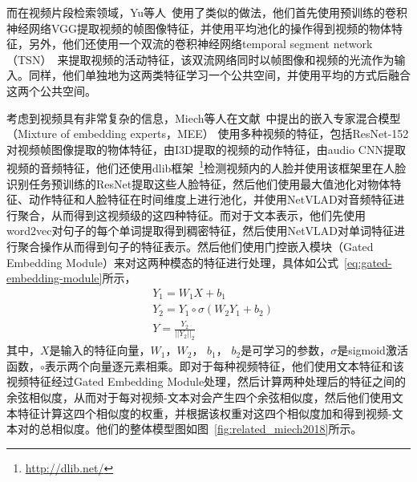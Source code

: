 而在视频片段检索领域，Yu等人~\cite{vsrel2020}使用了类似的做法，他们首先使用预训练的卷积神经网络VGG提取视频的帧图像特征，并使用平均池化的操作得到视频的物体特征，另外，他们还使用一个双流的卷积神经网络temporal segment network（TSN）~\cite{wang2016temporal}来提取视频的活动特征，该双流网络同时以帧图像和视频的光流作为输入。同样，他们单独地为这两类特征学习一个公共空间，并使用平均的方式后融合这两个公共空间。

考虑到视频具有非常复杂的信息，Miech等人在文献~\cite{miech2018learning}中提出的嵌入专家混合模型（Mixture of embedding experts，MEE） 使用多种视频的特征，包括ResNet-152对视频帧图像提取的物体特征，由I3D提取的视频的动作特征，由audio CNN提取视频的音频特征，他们还使用dlib框架~\footnote{\url{http://dlib.net/}}检测视频内的人脸并使用该框架里在人脸识别任务预训练的ResNet提取这些人脸特征，然后他们使用最大值池化对物体特征、动作特征和人脸特征在时间维度上进行池化，并使用NetVLAD对音频特征进行聚合，从而得到这视频级的这四种特征。而对于文本表示，他们先使用word2vec对句子的每个单词提取得到稠密特征，然后使用NetVLAD对单词特征进行聚合操作从而得到句子的特征表示。然后他们使用门控嵌入模块（Gated Embedding Module）来对这两种模态的特征进行处理，具体如公式~\ref{eq:gated-embedding-module}所示，
\begin{equation}
    \label{eq:gated-embedding-module}
    \begin{aligned}
        & Y_1 = W_1 X + b_1 \\
        & Y_2 = Y_1 \circ \sigma(W_2Y_1 + b_2) \\
        & Y = \frac{Y_2}{||Y_2||_2}
    \end{aligned}
\end{equation}
其中，$X$是输入的特征向量，$W_1$，$W_2$， $b_1$， $b_2$是可学习的参数，$\sigma$是sigmoid激活函数，$\circ$表示两个向量逐元素相乘。即对于每种视频特征，他们使用文本特征和该视频特征经过Gated Embedding Module处理，然后计算两种处理后的特征之间的余弦相似度，从而对于每对视频-文本对会产生四个余弦相似度，然后他们使用文本特征计算这四个相似度的权重，并根据该权重对这四个相似度加和得到视频-文本对的总相似度。他们的整体模型图如图~\ref{fig:related_miech2018}所示。

